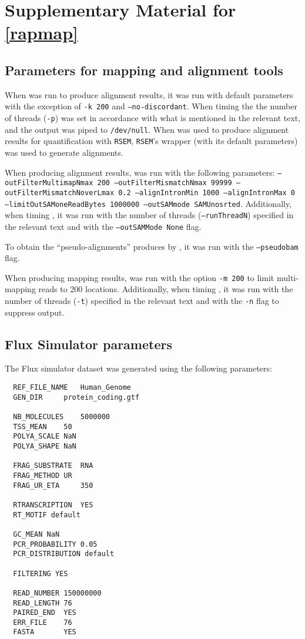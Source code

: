 
\chapter{Supplementary Material for \cref{rapmap}} %
\label{appendix-rapmap}

\section{Parameters for mapping and alignment tools}
\label{subsec:params}

When \bt was run to produce alignment results, it was run with default parameters with the exception of \texttt{-k 200} and \texttt{--no-discordant}.  When timing \bt the the number of threads (\texttt{-p}) was set in accordance with what is mentioned in the relevant text, and the output was piped to \texttt{/dev/null}.  When \bt was used to produce alignment results for quantification with \texttt{RSEM}, \texttt{RSEM}'s \bt wrapper (with its default parameters) was used to generate alignments.

When producing alignment results, \STAR was run with the following parameters: \texttt{--outFilterMultimapNmax 200 --outFilterMismatchNmax 99999 --outFilterMismatchNoverLmax 0.2 --alignIntronMin 1000 --alignIntronMax 0 --limitOutSAMoneReadBytes 1000000 --outSAMmode SAMUnosrted}.  Additionally, when timing \STAR, it was run with the number of threads (\texttt{--runThreadN}) specified in the relevant text and with the \texttt{--outSAMMode None} flag.


To obtain the ``pseudo-alignments'' produces by \kallisto, it was run with the \texttt{--pseudobam} flag.

When producing mapping results, \rapmap was run with the option \texttt{-m 200} to limit multi-mapping reads to 200 locations.  Additionally, when timing \rapmap, it was run with the number of threads (\texttt{-t}) specified in the relevant text and with the \texttt{-n} flag to suppress output.

\section{Flux Simulator parameters}
\label{subsec:flux_params}


The Flux simulator dataset was generated using the following parameters:

\begin{verbatim}
  REF_FILE_NAME   Human_Genome
  GEN_DIR     protein_coding.gtf

  NB_MOLECULES    5000000
  TSS_MEAN    50
  POLYA_SCALE NaN
  POLYA_SHAPE NaN

  FRAG_SUBSTRATE  RNA
  FRAG_METHOD UR
  FRAG_UR_ETA     350

  RTRANSCRIPTION  YES
  RT_MOTIF default

  GC_MEAN NaN
  PCR_PROBABILITY 0.05
  PCR_DISTRIBUTION default

  FILTERING YES

  READ_NUMBER 150000000
  READ_LENGTH 76
  PAIRED_END  YES
  ERR_FILE    76
  FASTA       YES
\end{verbatim}


